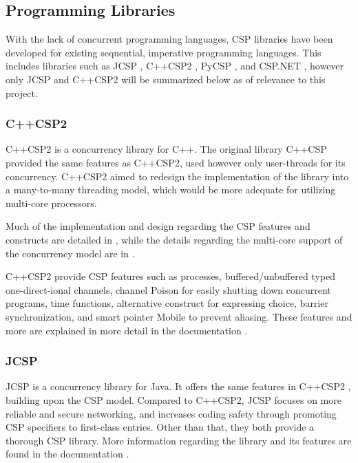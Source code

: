 \subsection{Programming Libraries}
\label{subsec:csp_prog_lib}

With the lack of concurrent programming languages, CSP libraries have been developed for existing sequential, imperative programming languages. This includes libraries such as JCSP \citep{jcsp}, C++CSP2 \citep{c++csp2}, PyCSP \citep{pycsp}, and CSP.NET \citep{cspnet}, however only JCSP and C++CSP2 will be summarized below as of relevance to this project.


\subsubsection{C++CSP2}
\label{sssec:c++csp2}

C++CSP2 \citep{c++csp2} is a concurrency library for C++. The original library C++CSP \citep{c++csp} provided the same features as C++CSP2, used however only user-threads for its concurrency. C++CSP2 aimed to redesign the implementation of the library into a many-to-many threading model, which would be more adequate for utilizing multi-core processors. 

Much of the implementation and design regarding the CSP features and constructs are detailed in \citet{c++csp}, while the details regarding the multi-core support of the concurrency model are in \citet{c++csp2}.

C++CSP2 provide CSP features such as processes, buffered/unbuffered typed one-direct\hyp{}ional channels, channel Poison for easily shutting down concurrent programs, time functions, alternative construct for expressing choice, barrier synchronization, and smart pointer Mobile to prevent aliasing. These features and more are explained in more detail in the documentation \citep{c++csp2doc}.


\subsubsection{JCSP}
\label{sssec:jcsp}

JCSP \citep{jcsp} is a concurrency library for Java. It offers the same features in C++CSP2 \citep{c++csp2}, building upon the CSP model. Compared to C++CSP2, JCSP focuses on more reliable and secure networking, and increases coding safety through promoting CSP specifiers to first-class entries. Other than that, they both provide a thorough CSP library. More information regarding the library and its features are found in the documentation \citep{jcspdoc}. 


